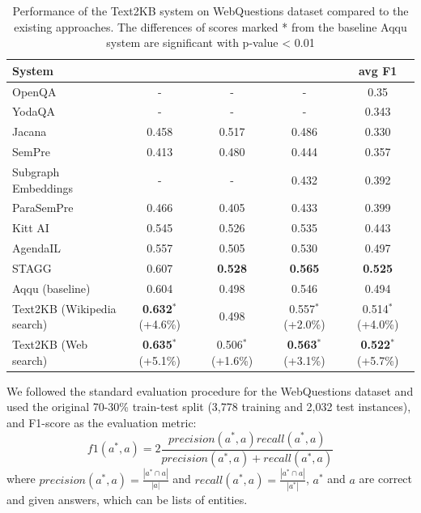 \begin{table}[ht!]
\label{table:webquestions_results}
\begin{minipage}{17cm}
\centering
\begin{tabular}{| p{4.5cm} | c | c | c | c | }
\hline
System & \centering{avg Recall} & \centering{avg Precision} & \centering{F1 of avg P and R} & avg F1 \\
\hline
OpenQA \cite{Fader:2014:OQA:2623330.2623677} & - & - & - & 0.35 \\
YodaQA \cite{baudivs2015systems} & - & - & - & 0.343 \\
\hline
Jacana \cite{yao2014information} & 0.458 & 0.517 & 0.486 & 0.330\\
SemPre \cite{Berant:EMNLP13} & 0.413 & 0.480 & 0.444 & 0.357\\
Subgraph Embeddings \cite{BordesCW14:emnlp} & - & - & 0.432 & 0.392\\
ParaSemPre \cite{berant2014semantic} & 0.466 & 0.405 & 0.433 & 0.399\\
Kitt AI \cite{yao-scratch-qa-naacl2015} & 0.545 & 0.526 & 0.535 & 0.443\\
AgendaIL \cite{berant2015imitation} & 0.557 & 0.505 & 0.530 & 0.497\\
STAGG \cite{yih2015semantic} & 0.607 & \textbf{0.528} & \textbf{0.565} & \textbf{0.525}\\
\hline
Aqqu (baseline) \cite{ACCU:2015} & 0.604 & 0.498 & 0.546 & 0.494\\
Text2KB (Wikipedia search) & \textbf{0.632}$^*$ (+4.6\%) & 0.498 & 0.557$^*$ (+2.0\%) & 0.514$^*$ (+4.0\%) \\
Text2KB (Web search) & \textbf{0.635}$^*$ (+5.1\%) & 0.506$^*$ (+1.6\%) & \textbf{0.563}$^*$ (+3.1\%) & \textbf{0.522}$^*$ (+5.7\%) \\
\hline
\end{tabular}
\end{minipage}
\vspace{-2mm}
\caption{Performance of the Text2KB system on WebQuestions dataset compared to the existing approaches. The differences of scores marked * from the baseline Aqqu system are significant with p-value < 0.01}
\end{table}

We followed the standard evaluation procedure for the WebQuestions dataset and used the original 70-30\% train-test split (3,778 training and 2,032 test instances), and F1-score as the evaluation metric:
$$f1(a^*, a) = 2\frac{precision(a^*,a) recall(a^*,a)}{precision(a^*,a) + recall(a^*,a)}$$
where $precision(a^*, a)=\frac{|a^* \cap a|}{|a|}$ and $recall(a^*, a) = \frac{|a^* \cap a|}{|a^*|}$, $a^*$ and $a$ are correct and given answers, which can be lists of entities.

